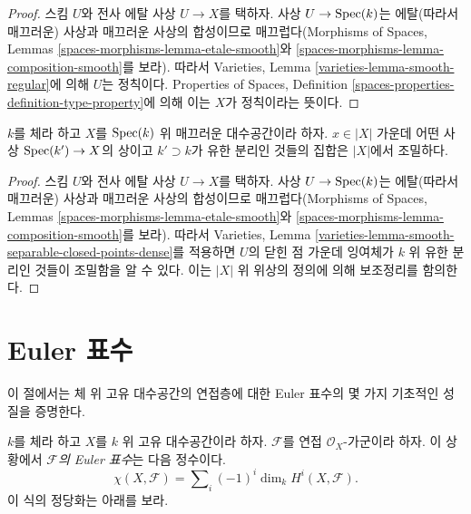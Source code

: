 \begin{proof}
스킴 $U$와 전사 에탈 사상 $U \to X$를 택하자. 사상
$U \to \mathop{\mathrm{Spec}}(k)$는 에탈(따라서 매끄러운) 사상과 매끄러운 사상의 합성이므로
매끄럽다(Morphisms of Spaces, Lemmas
\ref{spaces-morphisms-lemma-etale-smooth}와
\ref{spaces-morphisms-lemma-composition-smooth}를 보라). 따라서 Varieties,
Lemma \ref{varieties-lemma-smooth-regular}에 의해 $U$는 정칙이다.
Properties of Spaces, Definition
\ref{spaces-properties-definition-type-property}에 의해 이는 $X$가
정칙이라는 뜻이다.
\end{proof}

\begin{lemma}
\label{lemma-smooth-separable-closed-points-dense}
$k$를 체라 하고 $X$를 $\mathop{\mathrm{Spec}}(k)$ 위 매끄러운 대수공간이라 하자.
$x \in |X|$ 가운데 어떤 사상 $\mathop{\mathrm{Spec}}(k') \to X$의 상이고
$k' \supset k$가 유한 분리인 것들의 집합은 $|X|$에서 조밀하다.
\end{lemma}

\begin{proof}
스킴 $U$와 전사 에탈 사상 $U \to X$를 택하자. 사상
$U \to \mathop{\mathrm{Spec}}(k)$는 에탈(따라서 매끄러운) 사상과 매끄러운 사상의 합성이므로
매끄럽다(Morphisms of Spaces, Lemmas
\ref{spaces-morphisms-lemma-etale-smooth}와
\ref{spaces-morphisms-lemma-composition-smooth}를 보라). 따라서 Varieties,
Lemma \ref{varieties-lemma-smooth-separable-closed-points-dense}를 적용하면
$U$의 닫힌 점 가운데 잉여체가 $k$ 위 유한 분리인 것들이 조밀함을 알 수 있다.
이는 $|X|$ 위 위상의 정의에 의해 보조정리를 함의한다.
\end{proof}







\section{Euler 표수}
\label{section-euler}

\noindent
이 절에서는 체 위 고유 대수공간의 연접층에 대한 Euler 표수의 몇 가지
기초적인 성질을 증명한다.

\begin{definition}
\label{definition-euler-characteristic}
$k$를 체라 하고 $X$를 $k$ 위 고유 대수공간이라 하자. $\mathcal{F}$를 연접
$\mathcal{O}_X$-가군이라 하자. 이 상황에서 {\it $\mathcal{F}$의 Euler 표수}는
다음 정수이다.
$$
\chi(X, \mathcal{F}) = \sum\nolimits_i (-1)^i \dim_k H^i(X, \mathcal{F}).
$$
이 식의 정당화는 아래를 보라.
\end{definition}


